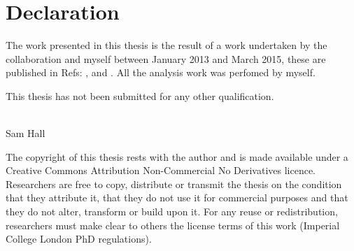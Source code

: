 \clearpage
\chapter*{\centering Declaration}

\begin{center}
  \begin{minipage}{0.8\textwidth}
    The work presented in this thesis is the result of a work undertaken by the
    \lhcb collaboration and myself between January 2013 and March 2015, these are
    published in Refs: \xxx, \xxx and \xxx.
    All the analysis work was perfomed by myself.

    This thesis has not been submitted for any other qualification.
    \\\\
    \begin{flushright}
      Sam Hall\\
      \shortdate
    \end{flushright}
  \end{minipage}

    \vfill

  \begin{minipage}{0.8\textwidth}
    \footnotesize
    The copyright of this thesis rests with the author and is made available under a Creative Commons
    Attribution Non-Commercial No Derivatives licence. Researchers are free to copy, distribute or
    transmit the thesis on the condition that they attribute it, that they do not use it for commercial
    purposes and that they do not alter, transform or build upon it. For any reuse or redistribution,
    researchers must make clear to others the license terms of this work (Imperial College London PhD
    regulations).
  \end{minipage}
\end{center}
